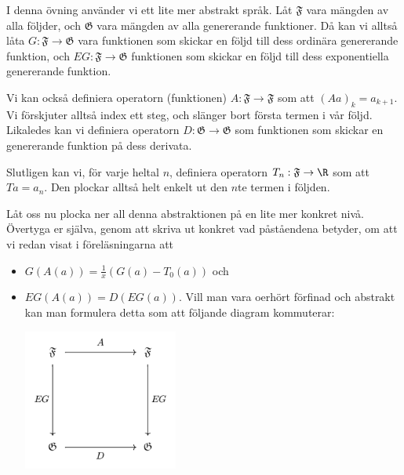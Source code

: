 \documentclass[nobib]{tufte-handout}
\begin{document}
\begin{xca}
  I denna övning använder vi ett lite mer abstrakt språk. Låt $\mathfrak{F}$ vara mängden av alla följder, och $\mathfrak{G}$ vara mängden av alla genererande funktioner. Då kan vi alltså låta $G: \mathfrak{F} \to \mathfrak{G}$ vara funktionen som skickar en följd till dess ordinära genererande funktion, och $EG: \mathfrak{F} \to \mathfrak{G}$ funktionen som skickar en följd till dess exponentiella genererande funktion.

  Vi kan också definiera operatorn (funktionen) $A: \mathfrak{F} \to \mathfrak{F}$ som att $(Aa)_k = a_{k+1}$. Vi förskjuter alltså index ett steg, och slänger bort första termen i vår följd. Likaledes kan vi definiera operatorn $D: \mathfrak{G} \to \mathfrak{G}$ som funktionen som skickar en genererande funktion på dess derivata.

  Slutligen kan vi, för varje heltal $n$, definiera operatorn $T_n: \mathfrak{F} \to \R$ som att $Ta = a_n$. Den plockar alltså helt enkelt ut den $n$te termen i följden.

  Låt oss nu plocka ner all denna abstraktionen på en lite mer konkret nivå. Övertyga er själva, genom att skriva ut konkret vad påståendena betyder, om att vi redan visat i föreläsningarna att
  \begin{itemize}
    \item $G(A(a)) = \frac{1}{x}\left(G(a) - T_0(a)\right)$ och
    \item $EG(A(a)) = D(EG(a))$. Vill man vara oerhört förfinad och abstrakt kan man formulera detta som att följande diagram kommuterar:
    
    \begin{center}
      \includegraphics[width=0.4\textwidth]{graphics/abstract_exercise_comm_diag.png}
    \end{center}
  \end{itemize}
\end{xca}
\end{document}
